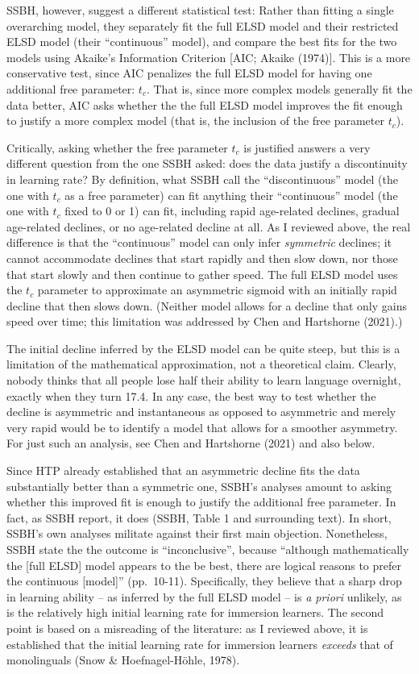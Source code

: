 \documentclass[
  english,
  doc,floatsintext]{apa6}
\begin{document}
SSBH, however, suggest a different statistical test: Rather than fitting a single overarching model, they separately fit the full ELSD model and their restricted ELSD model (their ``continuous'' model), and compare the best fits for the two models using Akaike's Information Criterion {[}AIC; Akaike (1974){]}. This is a more conservative test, since AIC penalizes the full ELSD model for having one additional free parameter: \(t_c\). That is, since more complex models generally fit the data better, AIC asks whether the the full ELSD model improves the fit enough to justify a more complex model (that is, the inclusion of the free parameter \(t_c\)).

Critically, asking whether the free parameter \(t_c\) is justified answers a very different question from the one SSBH asked: does the data justify a discontinuity in learning rate? By definition, what SSBH call the ``discontinuous'' model (the one with \(t_c\) as a free parameter) can fit anything their ``continuous'' model (the one with \(t_c\) fixed to 0 or 1) can fit, including rapid age-related declines, gradual age-related declines, or no age-related decline at all. As I reviewed above, the real difference is that the ``continuous'' model can only infer \emph{symmetric} declines; it cannot accommodate declines that start rapidly and then slow down, nor those that start slowly and then continue to gather speed. The full ELSD model uses the \(t_c\) parameter to approximate an asymmetric sigmoid with an initially rapid decline that then slows down. (Neither model allows for a decline that only gains speed over time; this limitation was addressed by Chen and Hartshorne (2021).)

The initial decline inferred by the ELSD model can be quite steep, but this is a limitation of the mathematical approximation, not a theoretical claim. Clearly, nobody thinks that all people lose half their ability to learn language overnight, exactly when they turn 17.4. In any case, the best way to test whether the decline is asymmetric and instantaneous as opposed to asymmetric and merely very rapid would be to identify a model that allows for a smoother asymmetry. For just such an analysis, see Chen and Hartshorne (2021) and also below.

Since HTP already established that an asymmetric decline fits the data substantially better than a symmetric one, SSBH's analyses amount to asking whether this improved fit is enough to justify the additional free parameter. In fact, as SSBH report, it does (SSBH, Table 1 and surrounding text). In short, SSBH's own analyses militate against their first main objection. Nonetheless, SSBH state the the outcome is ``inconclusive'', because ``although mathematically the {[}full ELSD{]} model appears to the be best, there are logical reasons to prefer the continuous {[}model{]}'' (pp.~10-11). Specifically, they believe that a sharp drop in learning ability -- as inferred by the full ELSD model -- is \emph{a priori} unlikely, as is the relatively high initial learning rate for immersion learners. The second point is based on a misreading of the literature: as I reviewed above, it is established that the initial learning rate for immersion learners \emph{exceeds} that of monolinguals (Snow \& Hoefnagel-Höhle, 1978).
\end{document}
